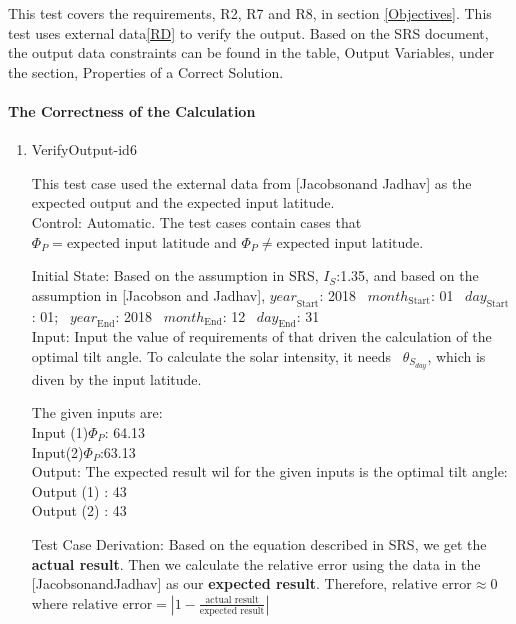 \documentclass[12pt, titlepage]{article}
\begin{document}
This test covers the requirements, R2, R7 and R8, in section \ref{Objectives}. This
test
uses external data\ref{RD} to verify the output. Based on the SRS 
document\cite{YS2019}, the output data constraints can be found in the
table, Output Variables, under the section, Properties of a Correct Solution. 

\paragraph{The Correctness of the Calculation}
\begin{enumerate}




\item{VerifyOutput-id6\\} 

This test case used the external data from [Jacobsonand
Jadhav\cite{JacobsonandJadhav}] as the expected output and the expected
input latitude.\\ 

Control: Automatic. The test cases contain cases that $\Phi_P
= \text{expected input latitude}$ and $\Phi_P \ne \text{expected input
latitude}$. 

Initial State: Based on the assumption in SRS\cite{YS2019}, $I_{S}$:1.35, and
based on the assumption in [Jacobson and Jadhav\cite{JacobsonandJadhav}],
$\mathit{year}_\text{Start}$: 2018
~$\mathit{month}_\text{Start}$: 01 
~$\mathit{day}_\text{Start}$: 01;
~$\mathit{year}_\text{End}$: 2018 
~$\mathit{month}_\text{End}$: 12
~$\mathit{day}_\text{End}$: 31\\ 

Input: Input the value of requirements of
\progname that driven the calculation of the optimal tilt angle. To calculate
the solar intensity, it needs ~$\theta_{S_{day}}$, which is diven by the input
latitude. 

The given inputs are:\\
 Input (1)$\Phi_P$: 64.13 \\ 
Input(2)$\Phi_P$:63.13\\

Output: The expected result wil for the given inputs is the optimal tilt
angle:\\ Output (1) : 43\\ Output (2) : 43\\


Test Case Derivation: Based on the equation described in SRS\cite{YS2019}, we
get the \textbf{actual result}. Then we calculate the relative error using the
data in the
 [JacobsonandJadhav\cite{JacobsonandJadhav}] as our \textbf{expected result}. 
Therefore, $\text{relative error} \approx 0$ where $\text{relative error} =
 | 1 - \frac{\text{actual result}}{ \text{expected result}} |$ 


\end{enumerate}
\end{document}
